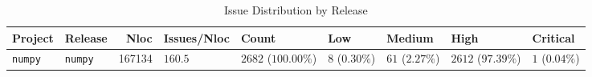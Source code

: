 \begin{table}
\caption{Issue Distribution by Release}
\label{tab:issue-release-distribution}
\begin{tabular}{llrllllll}
\toprule
Project & Release & Nloc & Issues/Nloc & Count & Low & Medium & High & Critical \\
\midrule
\texttt{numpy} & \texttt{numpy} & 167134 & $160.5$ & $2682$ ($100.00\%$) & $8$ ($0.30\%$) & $61$ ($2.27\%$) & $2612$ ($97.39\%$) & $1$ ($0.04\%$) \\
\bottomrule
\end{tabular}
\end{table}
